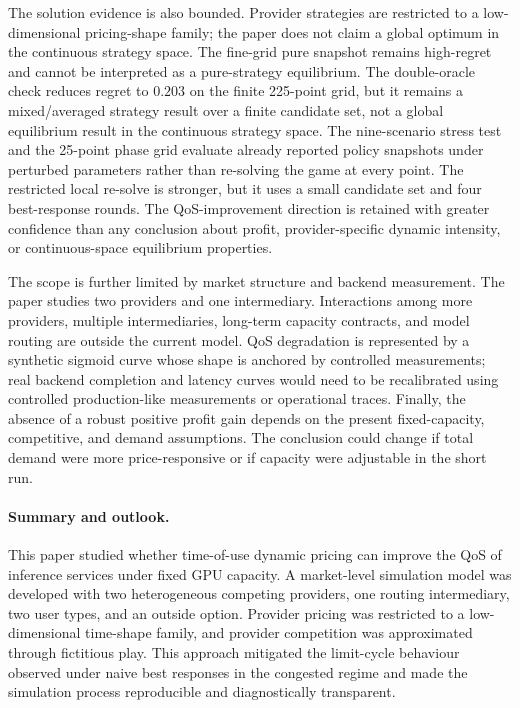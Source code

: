 \documentclass[11pt,a4paper]{article}
\begin{document}
The solution evidence is also bounded. Provider strategies are restricted to a low-dimensional pricing-shape family; the paper does not claim a global optimum in the continuous strategy space. The fine-grid pure snapshot remains high-regret and cannot be interpreted as a pure-strategy equilibrium. The double-oracle check reduces regret to $0.203$ on the finite 225-point grid, but it remains a mixed/averaged strategy result over a finite candidate set, not a global equilibrium result in the continuous strategy space. The nine-scenario stress test and the 25-point phase grid evaluate already reported policy snapshots under perturbed parameters rather than re-solving the game at every point. The restricted local re-solve is stronger, but it uses a small candidate set and four best-response rounds. The QoS-improvement direction is retained with greater confidence than any conclusion about profit, provider-specific dynamic intensity, or continuous-space equilibrium properties.

The scope is further limited by market structure and backend measurement. The paper studies two providers and one intermediary. Interactions among more providers, multiple intermediaries, long-term capacity contracts, and model routing are outside the current model. QoS degradation is represented by a synthetic sigmoid curve whose shape is anchored by controlled measurements; real backend completion and latency curves would need to be recalibrated using controlled production-like measurements or operational traces. Finally, the absence of a robust positive profit gain depends on the present fixed-capacity, competitive, and demand assumptions. The conclusion could change if total demand were more price-responsive or if capacity were adjustable in the short run.

\paragraph{Summary and outlook.}

This paper studied whether time-of-use dynamic pricing can improve the QoS of inference services under fixed GPU capacity. A market-level simulation model was developed with two heterogeneous competing providers, one routing intermediary, two user types, and an outside option. Provider pricing was restricted to a low-dimensional time-shape family, and provider competition was approximated through fictitious play. This approach mitigated the limit-cycle behaviour observed under naive best responses in the congested regime and made the simulation process reproducible and diagnostically transparent.
\end{document}
